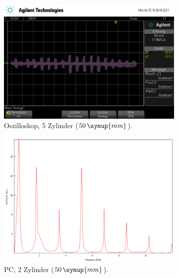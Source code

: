 \begin{figure}
\begin{subfigure}[b]{0.3\textwidth}
        \centering
        \includegraphics[width=\textwidth]{data/1_1zylinder50mm/scope_5.png}
        \caption{Oszilloskop, 5 Zylinder ($50 \, \symup{mm}$).}
    \end{subfigure}
    \hfill
    \begin{subfigure}[b]{0.3\textwidth}
        \centering
        \includegraphics[width=\textwidth]{data/1_2zylinder50mmPC/2.png}
        \caption{PC, 2 Zylinder ($50 \, \symup{mm}$).}
    \end{subfigure}
    \hfill
    \begin{subfigure}[b]{0.3\textwidth}
        \centering

\end{subfigure}
\end{figure}
